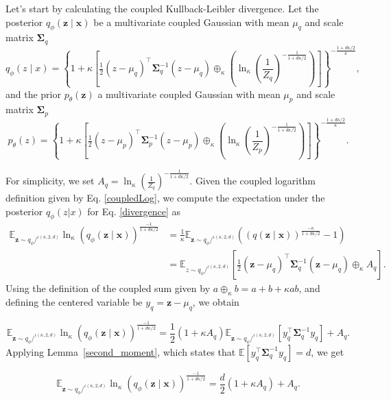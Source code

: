 \documentclass[twoside,11pt]{article}
\renewenvironment{proof}{\par\noindent{\bf Proof\ }}{\hfill\BlackBox\par\vspace{2mm}}
\begin{document}
\begin{proof}
Let's start by calculating the coupled Kullback-Leibler divergence. Let the posterior $q_{\phi}(\mathbf{z} \mid \boldsymbol{x})$ be a multivariate coupled Gaussian with mean $\mu_q$ and scale matrix $\boldsymbol{\Sigma}_q$
\[
q_{\phi}(z \mid x) = \left \{ 1+\kappa\left[\tfrac{1}{2}(z-\mu_q)^{\intercal}\boldsymbol{\Sigma}_q^{-1}(z-\mu_q) \oplus_\kappa \left(\ln_\kappa\left(\frac{1}{Z_q}\right)^{-\frac{1}{1+d\kappa/2}}\right)\right]\right \}^{-\frac{1+d\kappa/2}{\kappa}},
\]
and the prior $p_{\theta}(\mathbf{z})$ a multivariate coupled Gaussian with mean $\mu_p$ and scale matrix $\boldsymbol{\Sigma}_p$
\[
p_{\theta}(z) = \left \{ 1+\kappa\left[\tfrac{1}{2}(z-\mu_p)^{\intercal}\boldsymbol{\Sigma}_p^{-1}(z-\mu_p) \oplus_\kappa \left(\ln_\kappa\left(\frac{1}{Z_p}\right)^{-\frac{1}{1+d\kappa/2}}\right)\right]\right \} ^{-\frac{1+d\kappa/2}{\kappa}}.
\]

For simplicity, we set $A_q=\ln_\kappa\left(\frac{1}{Z_q}\right)^{-\frac{1}{1+d\kappa/2}}$. Given the coupled logarithm definition given by Eq. \eqref{coupledLog}, we compute the expectation under the posterior $q_{\phi}(z|x)$ for Eq. \eqref{divergence} as
\begin{align*}
   \mathbb{E}_{\mathbf{z} \sim q_\phi/^{\iota(\kappa,2,d)}} \ln_\kappa \left(q_{\phi} (\textbf{z}\mid \textbf{x}) \right)^{\frac{-1}{1+d\kappa/2}} & = \frac{1}{\kappa} \mathbb{E}_{\mathbf{z} \sim q_\phi/^{\iota(\kappa,2,d)}}  \left( \left(q (\textbf{z}\mid \textbf{x}) \right)^{\frac{-\kappa}{1+d\kappa/2}} - 1 \right)\\
  & = \mathbb{E}_{z \sim q_{\phi}/^{\iota(\kappa,2,d)}}\left[
\frac{1}{2}(\mathbf{z}-\mu_q)^\intercal\boldsymbol{\Sigma}_q^{-1}(\mathbf{z}-\mu_q)
\oplus_{\kappa} A_q
\right].
\end{align*}
Using the definition of the coupled sum given by $a \oplus_{\kappa} b = a + b + \kappa ab$, and defining the centered variable be $y_q = \mathbf{z}-\mu_q$, we obtain

\[
\mathbb{E}_{\mathbf{z} \sim q_\phi/^{\iota(\kappa,2,d)}} \ln_\kappa \left(q_{\phi} (\textbf{z}\mid \textbf{x}) \right)^{\frac{-1}{1+d\kappa/2}}  =
\frac{1}{2}(1+\kappa A_q)
\mathbb{E}_{\mathbf{z} \sim q_\phi/^{\iota(\kappa,2,d)}} \!\left[
y_q^\intercal\boldsymbol{\Sigma}_q^{-1}y_q
\right]
+A_q.
\]
Applying Lemma~\ref{second_moment}, which states that $\mathbb{E}\!\left[
y_q^\intercal\boldsymbol{\Sigma}_q^{-1}y_q
\right] = d$, we get

\begin{equation} \label{posteriorExpectationFinal}
     \mathbb{E}_{\mathbf{z} \sim q_\phi/^{\iota(\kappa,2,d)}} \ln_\kappa \left(q_{\phi} (\textbf{z}\mid \textbf{x}) \right)^{\frac{-1}{1+d\kappa/2}}  =\frac{d}{2}(1+\kappa A_q)+ A_q.
\end{equation}


\end{proof}
\end{document}
